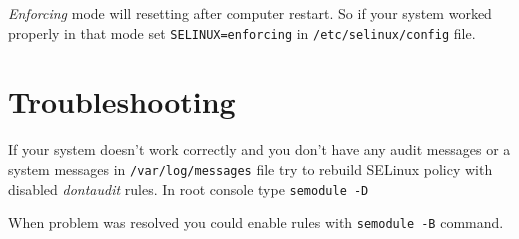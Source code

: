 \emph{Enforcing} mode will resetting after computer restart. So if your
system worked properly in that mode set \texttt{SELINUX=enforcing} in
\texttt{/etc/selinux/config} file.

\section{Troubleshooting}

If your system doesn't work correctly and you don't have any audit
messages or a system messages in \texttt{/var/log/messages} file try to
rebuild SELinux policy with disabled \emph{dontaudit} rules. In root
console type \texttt{semodule -D}

When problem was resolved you could enable rules with
\texttt{semodule -B} command.
%
